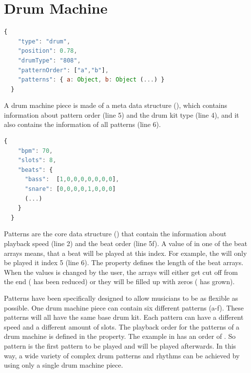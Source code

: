 \section{Drum Machine}
\label{impl-drum-machine}

\begin{lstlisting}[language=JavaScript, caption=A drum machine's data structure, label=lst:drum-structure]
  {
    "type": "drum",
    "position": 0.78,
    "drumType": "808",
    "patternOrder": ["a","b"],
    "patterns": { a: Object, b: Object (...) }
  }
\end{lstlisting}

A drum machine piece is made of a meta data structure (), which contains information about pattern order (line 5) and the drum kit type (line 4), and it also contains the information of all patterns (line 6).

\begin{lstlisting}[language=JavaScript, caption=A pattern's data structure, label=lst:pattern-structure]
  {
    "bpm": 70,
    "slots": 8,
    "beats": {
      "bass":  [1,0,0,0,0,0,0,0],
      "snare": [0,0,0,0,1,0,0,0]
      (...)
    }
  }
\end{lstlisting}

Patterns are the core data structure () that contain the information about playback speed (line 2) and the beat order (line 5f). A value of  in one of the beat arrays means, that a beat will be played at this index. For example, the  will only be played it index 5 (line 6). The  property defines the length of the beat arrays. When the values is changed by the user, the arrays will either get cut off from the end ( has been reduced) or they will be filled up with zeros ( has grown).

Patterns have been specifically designed to allow musicians to be as flexible as possible. One drum machine piece can contain six different patterns (a-f). These patterns will all have the same base drum kit. Each pattern can have a different speed and a different amount of slots. The playback order for the patterns of a drum machine is defined in the  property. The example in  has an order of \code{["a", "b"]}. So pattern  is the first pattern to be played and  will be played afterwards. In this way, a wide variety of complex drum patterns and rhythms can be achieved by using only a single drum machine piece.

